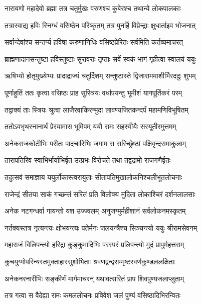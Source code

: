 \twolineshloka
{नारायणो महादेवो ब्रह्मा तत्र चतुर्मुखः}
{वरुणश्च कुबेरश्च तथान्ये लोकपालकाः}%

\twolineshloka
{तत्रास्वाद्य हविः स्निग्धं वसिष्ठेन परिष्कृतम्}
{तत्र पुनर्हि विप्रेन्द्राः क्षुधार्ताइव भोजनात्}%

\twolineshloka
{सर्वान्देवांश्च सन्तर्प्य हविषा करुणानिधिः}
{वसिष्ठप्रेरितः सर्वमिति कर्तव्यमाचरत्}%

\twolineshloka
{ब्राह्मणादानसन्तुष्टा हविस्तुष्टाः सुरावराः}
{तृप्ताः सर्वे स्वकं भागं गृहीत्वा स्वालयं ययुः}%

\twolineshloka
{ऋषिभ्यो होतृमुख्येभ्यः प्रादाद्राज्यं चतुर्दिशम्}
{सन्तुष्टास्ते द्विजाराममाशीर्भिरददुः शुभम्}%

\twolineshloka
{पूर्णाहुतिं ततः कृत्वा वसिष्ठः प्राह सुस्त्रियः}
{वर्धापयन्तु भूमीशं यागपूर्तिकरं परम्}%

\twolineshloka
{तद्वाक्यं ताः स्त्रियः श्रुत्वा लाजैरवाकिरन्मुदा}
{लावण्यजितकन्दर्पं महामणिविभूषितम्}%

\twolineshloka
{ततोऽवभृथस्नानार्थं प्रेरयामास भूमिपम्}
{ययौ रामः सहस्वीयैः सरयूतीरमुत्तमम्}%

\twolineshloka
{अनेकराजकोटीभिः परीतः पादचारिभिः}
{जगाम स सरिच्छ्रेष्ठां पक्षिवृन्दसमाकुलाम्}%

\twolineshloka
{तारापतिरिव स्वाभिर्भार्याभिर्वृत उत्प्रभः}
{विरोचते तथा तद्वद्रामो राजगणैर्वृतः}%

\twolineshloka
{तदुत्सवं समाज्ञाय ययुर्लोकास्त्वरायुताः}
{सीतापतिमुखालोकनिश्चलीभूतलोचनाः}%

\twolineshloka
{राजेन्द्रं सीतया साकं गच्छन्तं सरितं प्रति}
{विलोक्य मुदिता लोकाश्चिरं दर्शनलालसाः}%

\twolineshloka
{अनेक नटगन्धर्वा गायन्तो यश उज्ज्वलम्}
{अनुजग्मुर्महीशानं सर्वलोकनमस्कृतम्}%

\twolineshloka
{नर्तक्यस्तत्र नृत्यन्त्यः क्षोभयन्त्यः पतेर्मनः}
{जलयन्त्रैश्च सिञ्चन्त्यो ययुः श्रीरामसेवनम्}%

\twolineshloka
{महाराजं विलिपन्त्यो हरिद्रा कुङ्कुमादिभिः}
{परस्परं प्रलिपन्त्यो मुदं प्रापुर्महत्तराम्}%

\twolineshloka
{कुचयुग्मोपरिन्यस्तमुक्ताहारसुशोभिताः}
{श्रवणद्वन्द्वसम्मृष्टस्वर्णकुण्डललक्षिताः}%

\twolineshloka
{अनेकनरनारीभिः सङ्कीर्णं मार्गमाचरन्}
{यथावत्सरितं प्राप शिवपुण्यजलाप्लुताम्}%

\twolineshloka
{तत्र गत्वा स वैदेह्या रामः कमललोचनः}
{प्रविवेश जलं पुण्यं वसिष्ठादिभिरन्वितः}%

